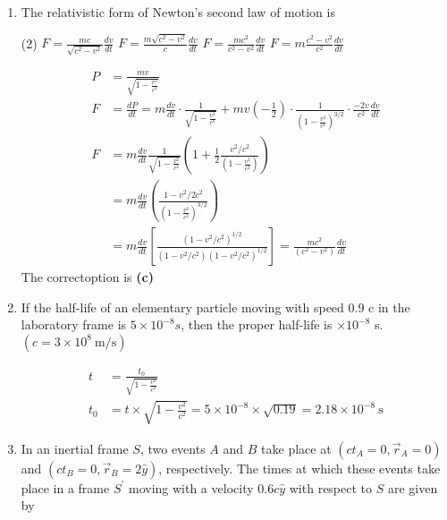 \begin{enumerate}
	\item  The relativistic form of Newton's second law of motion is 
{	}
\begin{tasks}(2)
	\task[\textbf{A.}] $F=\frac{m c}{\sqrt{c^{2}-v^{2}}} \frac{d v}{d t}$ 
	\task[\textbf{B.}]$F=\frac{m \sqrt{c^{2}-v^{2}}}{c} \frac{d v}{d t}$
	\task[\textbf{C.}]$F=\frac{m c^{2}}{c^{2}-v^{2}} \frac{d v}{d t}$
	\task[\textbf{D.}]$F=m \frac{c^{2}-v^{2}}{c^{2}} \frac{d v}{d t}$
\end{tasks}
\begin{answer}
	\begin{align*}
	P&=\frac{m v}{\sqrt{1-\frac{v^{2}}{c^{2}}}}	\\
	F&=\frac{d P}{d t}=m \frac{d v}{d t} \cdot \frac{1}{\sqrt{1-\frac{v^{2}}{c^{2}}}}+m v\left(-\frac{1}{2}\right) \cdot \frac{1}{\left(1-\frac{v^{2}}{c^{2}}\right)^{3 / 2}} \cdot \frac{-2 v}{c^{2}} \frac{d v}{d t}\\
	F&=m \frac{d v}{d t} \frac{1}{\sqrt{1-\frac{v^{2}}{c^{2}}}}\left(1+\frac{1}{2} \frac{v^{2} / c^{2}}{\left(1-\frac{v^{2}}{c^{2}}\right)}\right)\\
	&=m \frac{d v}{d t}\left(\frac{1-v^{2} / 2 c^{2}}{\left(1-\frac{v^{2}}{c^{2}}\right)^{3 / 2}}\right)\\
	&=m \frac{d v}{d t}\left[\frac{\left(1-v^{2} / c^{2}\right)^{1 / 2}}{\left(1-v^{2} / c^{2}\right)\left(1-v^{2} / c^{2}\right)^{1 / 2}}\right]=\frac{m c^{2}}{\left(c^{2}-v^{2}\right)} \frac{d v}{d t}
	\end{align*}
The correctoption is \textbf{(c)}
\end{answer}
	\item If the half-life of an elementary particle moving with speed $0.9$ c in the laboratory frame is $5 \times 10^{-8} s$, then the proper half-life is $\times 10^{-8}$ s. $\left(c=3 \times 10^{8} \mathrm{~m} / \mathrm{s}\right)$
	{}
\begin{answer}
\begin{align*}
	t&=\frac{t_{0}}{\sqrt{1-\frac{v^{2}}{c^{2}}}}\\
	t_{0}&=t \times \sqrt{1-\frac{v^{2}}{c^{2}}}=5 \times 10^{-8} \times \sqrt{0.19}=2.18 \times 10^{-8} \mathrm{~s}
\end{align*}	
\end{answer}
	\item In an inertial frame $S$, two events $A$ and $B$ take place at $\left(c t_{A}=0, \vec{r}_{A}=0\right)$ and $\left(c t_{B}=0, \vec{r}_{B}=2 \hat{y}\right)$, respectively. The times at which these events take place in a frame $S^{\prime}$ moving with a velocity $0.6 c \hat{y}$ with respect to $S$ are given by

\end{enumerate}
